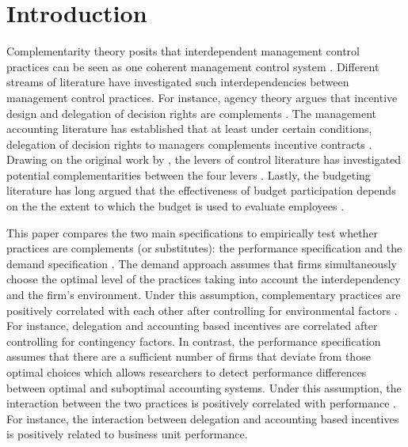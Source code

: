 \documentclass[12pt]{article}
\begin{document}

\section{Introduction}\label{introduction}

Complementarity theory posits that interdependent management control practices can be seen as one coherent management control system \citep{milgrom_complementarities_1995, grabner_management_2013}. Different streams of literature have investigated such interdependencies between management control practices. For instance, agency theory argues that incentive design and delegation of decision rights are complements \citep{holmstrom_firm_1994}. The management accounting literature has established that at least under certain conditions, delegation of decision rights to managers complements incentive contracts \citep{bouwens_assessing_2007, indjejikian_accounting_2012, moers_performance_2006}. Drawing on the original work by \citet{simons_levers_1994, simons_performance_2000}, the levers of control literature has investigated potential complementarities between the four levers \citep{widener_empirical_2007}. Lastly, the budgeting literature has long argued that the effectiveness of budget participation depends on the the extent to which the budget is used to evaluate employees \citep{brownell_task_1991, dunk_effect_1993}.
 
This paper compares the two main specifications to empirically test whether practices are complements (or substitutes): the performance specification and the demand specification \citep{grabner_management_2013}. The demand approach assumes that firms simultaneously choose the optimal level of the practices taking into account the interdependency and the firm's environment. Under this assumption, complementary practices are positively correlated with each other after controlling for environmental factors \citep{arora_testing_1996, grabner_management_2013, johansson_testing_2018, hofmann_organizational_2017}. For instance, delegation and accounting based incentives are correlated after controlling for contingency factors. In contrast, the performance specification assumes that there are a sufficient number of firms that deviate from those optimal choices which allows researchers to detect performance differences between optimal and suboptimal accounting systems. Under this assumption, the interaction between the two practices is positively correlated with performance \citep{athey_empirical_1998, carree_note_2011, grabner_management_2013, hofmann_organizational_2017}. For instance, the interaction between delegation and accounting based incentives is positively related to business unit performance. 
\end{document}
